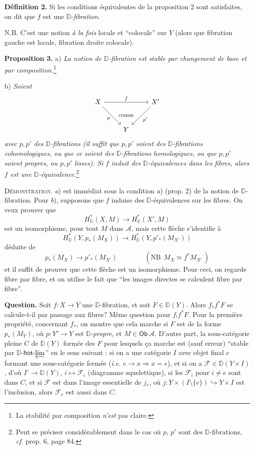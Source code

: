 \documentclass[11pt]{article}
\newcommand{\printedpage}[1]{\marginpar{\footnotesize p.~#1}}
\newcommand{\msp}[1]{\marginpar{\footnotesize [#1]}}
\newcommand{\DD}{\mathbb{D}}
\newcommand{\Ob}{\mathsf{Ob}}
\begin{document}
\textbf{Définition 2.} Si les conditions équivalentes de la proposition 2 sont satisfaites, on dit que $f$ est une $\DD$-\textit{fibration}.

N.B. C'est une notion \textit{à la fois} locale et “colocale” sur $Y$ (alors que fibration gauche est locale, fibration droite colocale).

\printedpage{50}

\textbf{Proposition 3.} a) \textit{La notion de $\DD$-fibration est stable par changement de base et par composition.}\footnote[38]{La stabilité par composition \textit{n'est} pas claire.}

\indent b) \textit{Soient}
\[
\begin{tikzcd}[column sep=normal, row sep=large]
X \arrow[rr, "f"] \arrow[dr, "p"'] & \phantom{X} & X' \arrow[dl, "p'"] \\
& Y &
\arrow[from=1-2, to=2-2, phantom, "\text{\footnotesize comm}"]
\end{tikzcd}
\]
\textit{avec $p,p'$ des $\DD$-fibrations (il suffit que $p,p'$ soient des $\DD$-fibrations cohomologiques, ou que ce soient des $\DD$-fibrations homologiques, ou que $p,p'$ soient propres, ou $p,p'$ lisses). Si $f$ induit des $\DD$-équivalences dans les fibres, alors $f$ est une $\DD$-équivalence.}\footnote[39]{Peut se préciser considérablement dans le cas où $p$, $p'$ sont des $\DD$-fibrations, \textit{cf.} prop. 6, page 84.}

\indent\textsc{Démonstration.} \textit{a}) est immédiat sous la condition \textit{a}) (prop. 2) de la notion de $\DD$-fibration. Pour \textit{b}), supposons que $f$ induise des $\DD$-équivalences sur les fibres. On veux prouver que %
\[
H^*_{\DD}(X,M) \longrightarrow H^*_{\DD}(X',M)
\]
est un isomorphisme, pour tout $M$ dans $\mathcal{A}$, mais cette flèche s'identifie à
\[
H^*_{\DD}(Y, p_*(M_X)) \longrightarrow H^*_{\DD}(Y, p'_*(M_{X'}))
\]
déduite de
\[
p_*(M_X) \longrightarrow p'_*(M_{X'}) \qquad\qquad (\text{NB}\ \ M_X \simeq f^*M_{X'}\,)
\]
\msp{page 82}
et il suffit de prouver que cette flèche est un isomorphisme. Pour ceci, on regarde fibre par fibre, et on utilise le fait que “les images directes se calculent fibre par fibre”.

\textbf{Question.} Soit $f : X \to Y$ une $\DD$-fibration, et soit $F \in \DD(Y)$. Alors $f_*f^*F$ se calcule-t-il par passage aux fibres? Même question pour $f_!f^*F$. Pour la première propriété, concernant $f_*$, on montre que cela marche si $F$ est de la forme $p_*(M_Y)$, où $p : Y' \to Y$ est $\DD$-\textit{propre,} et $M \in \Ob\, \mathcal{A}$. D'autre part, la sous-catégorie pleine $C$ de $\DD(Y)$ formée des $F$ pour lesquels ça marche est (sauf erreur) “stable par $\DD$-$\mathsf{hot}$-$\varprojlim$” en le sens suivant : si on a une catégorie $I$ avec objet final $e$ formant une sous-catégorie fermée (\textit{i.e.} $e \to x \Rightarrow x = e$), et si on a $\mathcal{F} \in \DD(Y \times I)$, d'où $I^\circ \to \DD(Y)$, $i \mapsto \mathcal{F}_i$ (diagramme squelettique), si les $\mathcal{F}_i$ pour $i \neq e$ sont dans $C$, et si $\mathcal{F}$ est dans l'image essentielle de $j_*$, où $j : Y \times (I \setminus \{e\}) \hookrightarrow Y \times I$ est l'inclusion, alors $\mathcal{F}_e$ est aussi dans $C$.
\end{document}
